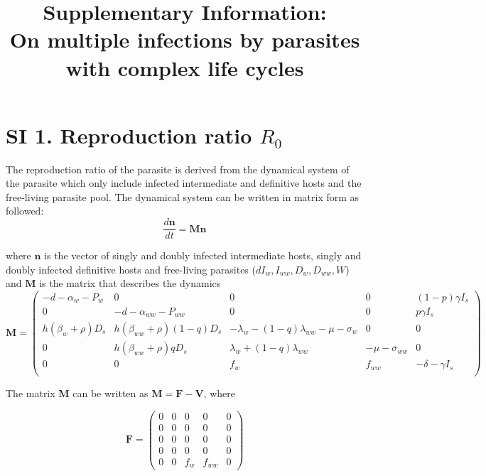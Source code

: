 \documentclass[11pt]{article}
\title{Supplementary Information:\\ On multiple infections by parasites with complex life cycles}
\date{}
\begin{document}
\maketitle

\renewcommand{\theequation}{SI.\arabic{equation}}
\setcounter{equation}{0}

\renewcommand{\thefigure}{SI.\arabic{figure}}
\renewcommand{\thefigure}{SI.\arabic{figure}}
\setcounter{figure}{0}

\renewcommand{\thetable}{SI.\arabic{table}}
\setcounter{table}{0}

\section*{SI 1. Reproduction ratio $R_0$}

The reproduction ratio of the parasite is derived from the dynamical system of the parasite which only include infected intermediate and definitive hosts and the free-living parasite pool. The dynamical system can be written in matrix form as followed:
\[
\frac{d \mathbf{n}}{dt} = \mathbf{M} \mathbf{n}
\]

where $\mathbf{n}$ is the vector of singly and doubly infected intermediate hosts, singly and doubly infected definitive hosts and free-living parasites ($dI_w, I_{ww}, D_w, D_{ww}, W$) and $\mathbf{M}$ is the matrix that describes the dynamics
\[ \mathbf{M} = 
\begin{pmatrix}
- d - \alpha_w - P_w & 0 & 0 & 0 & (1 - p) \gamma I_s \\
0 & -d - \alpha_{ww} - P_{ww} & 0 & 0 & p \gamma I_s \\
h (\beta_w + \rho ) D_s &  h (\beta_{ww} + \rho) (1-q) D_s &-\lambda_w -   (1-q)\lambda_{ww}  -\mu -\sigma_w & 0 & 0 \\
0 &  h (\beta_{ww} + \rho ) q D_s  & \lambda_w +  (1-q) \lambda_{ww}  & -\mu - \sigma_{ww} & 0 \\
 0 & 0 & f_w & f_{ww} &- \delta - \gamma I_s  \\
\end{pmatrix}
\]

The matrix $\mathbf{M}$ can be written as $\mathbf{M} = \mathbf{F} - \mathbf{V}$, where

\[
\mathbf{F} = 
\begin{pmatrix}
0 & 0 & 0 & 0 & 0  \\
0 & 0 & 0 & 0 & 0  \\
0 & 0 & 0 & 0 & 0  \\
0 & 0 & 0 & 0 & 0  \\
0 & 0 & f_w & f_{ww} & 0
\end{pmatrix}
\]
\end{document}
